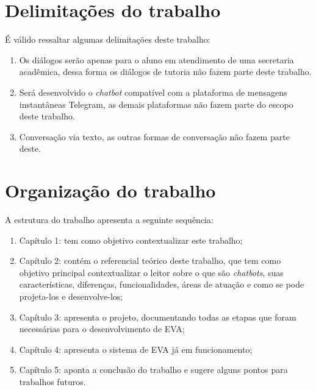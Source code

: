 
\section{Delimitações do trabalho}\label{cap:01:sec:03:delimitacao}

É válido ressaltar algumas delimitações deste trabalho:

\begin{enumerate}[label=\alph*)]
\tightlist
    \item Os diálogos serão apenas para o aluno em atendimento de uma secretaria acadêmica, dessa forma os diálogos de tutoria não fazem parte deste trabalho.
    \item Será desenvolvido o \textit{chatbot} compatível com a plataforma de mensagens instantâneas Telegram, as demais plataformas não fazem parte do escopo deste trabalho.
    \item Conversação via texto, as outras formas de conversação não fazem parte deste.
\end{enumerate}

\section{Organização do trabalho}

A estrutura do trabalho apresenta a seguinte sequência:

\begin{enumerate}[label=\alph*)]
\tightlist
    \item Capítulo 1: tem como objetivo contextualizar este trabalho; 
    \item Capítulo 2: contém o referencial teórico deste trabalho, que tem como objetivo principal contextualizar o leitor sobre o que são \textit{chatbots}, suas características, diferenças, funcionalidades, áreas de atuação e como se pode projeta-los e desenvolve-los;
    \item Capítulo 3: apresenta o projeto, documentando todas as etapas que foram necessárias para o desenvolvimento de EVA;
    \item Capítulo 4: apresenta o sistema de EVA já em funcionamento;
    \item Capítulo 5: aponta a conclusão do trabalho e sugere alguns pontos para trabalhos futuros.
\end{enumerate}

